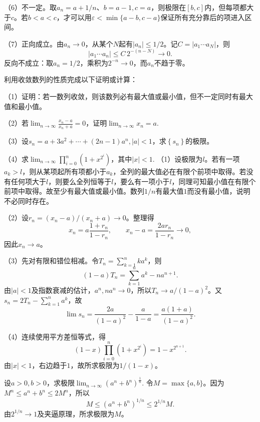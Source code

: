 （6）不一定。取\(a_n=a+1/n\)、\(b=a-1,c=a\)，则极限在\([b,c]\)内，但每项都大于\(c\)。若\(b<a<c\)，才可以用\(\varepsilon<\min\{a-b,c-a\}\)保证所有充分靠后的项进入区间。

（7）正向成立。由\(a_n\to0\)，从某个\(N\)起有\(|a_n|\le1/2\)。记\(C=|a_1\cdots a_N|\)，则
\[
|a_1\cdots a_n|\le C\,2^{-(n-N)}\to0.
\]
反向不成立：取\(a_n=1/2\)，乘积为\(2^{-n}\to0\)，而\(a_n\)不趋于零。


利用收敛数列的性质完成以下证明或计算：

    （1）证明：若一数列收敛，则该数列必有最大值或最小值，但不一定同时有最大值和最小值。

    （2）若\(\lim_{n \to \infty} \frac{x_{n} - a}{x_{n} + a} =
    0\)，证明\(\lim_{n \to \infty} x_{n} = a\).

    （3）设\(s_{n} = a + 3 a^{2} + \cdots + \left( 2 n - 1 \right) a^{n} , \left| a
    \right| < 1\)，求\(\left\{ s_{n} \right\}\)的极限。

    （4）求\(\lim_{n \to \infty} \prod _{i = 0}^{n} \left( 1 + x^{2^{i}}
    \right)\)，其中\(\left| x \right| < 1\).
\solutionanswer
（1）设极限为\(l\)。若有一项\(a_k>l\)，则从某项起所有项都小于\(a_k\)，全列的最大值必在有限个前项中取得。若没有任何项大于\(l\)，则要么全列恒等于\(l\)，要么有一项小于\(l\)，同理可知最小值在有限个前项中取得。故至少有最大值或最小值。数列\(1/n\)有最大值\(1\)而没有最小值，说明不必同时存在。

（2）设\(r_n=(x_n-a)/(x_n+a)\to0\)。整理得
\[
x_n=a\frac{1+r_n}{1-r_n},\qquad x_n-a=\frac{2ar_n}{1-r_n}\to0,
\]
因此\(x_n\to a\)。

（3）先对有限和错位相减。令\(T_n=\sum_{k=1}^nka^k\)，则
\[
(1-a)T_n=\sum_{k=1}^na^k-na^{n+1}.
\]
由\(|a|<1\)及指数衰减的估计，\(a^n,na^n\to0\)，所以\(T_n\to a/(1-a)^2\)。又\(s_n=2T_n-\sum_{k=1}^na^k\)，故
\[
\lim s_n=\frac{2a}{(1-a)^2}-\frac a{1-a}=\frac{a(1+a)}{(1-a)^2}.
\]

（4）连续使用平方差恒等式，得
\[
(1-x)\prod_{i=0}^n(1+x^{2^i})=1-x^{2^{n+1}}.
\]
由\(|x|<1\)，右边趋于\(1\)，故所求极限为\(1/(1-x)\)。


设\(a > 0 , b > 0\)，求极限\(\lim_{n \to \infty} {\left( a^{n} + b^{n} \right)}^{\frac{1}{n}}\).
\solutionanswer
令\(M=\max\{a,b\}\)。因为\(M^n\le a^n+b^n\le2M^n\)，所以
\[
M\le(a^n+b^n)^{1/n}\le2^{1/n}M.
\]
由\(2^{1/n}\to1\)及夹逼原理，所求极限为\(M\)。


